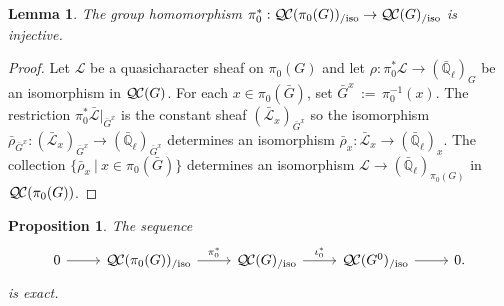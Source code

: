 \documentclass[CM,Submssn,SecEq]{degruyter-crelle} %
\theoremstyle{plain}
\newtheorem{proposition}[theorem]{Proposition}
\newtheorem{lemma}[theorem]{Lemma}
\theoremstyle{definition}
\theoremstyle{remark}
\newcommand{\EE}{\mathbb{\bar Q}_\ell}
\newcommand{\ceq}{{\, :=\, }}
\newcommand{\tq}{{\ \vert\ }}
\newcommand{\qcs}[1]{{\mathcal{#1}}}
\newcommand{\gqcs}[1]{{\mathcal{\bar #1}}}
\newcommand{\QC}{{\mathcal{Q\hskip-0.8pt C}}}
\newcommand{\QCiso}[1]{\QC(#1)_{/\text{iso}}}
\newcommand{\bG}{\bar{G}}
\newcommand{\brho}{{\bar\rho}}
\begin{document}
\begin{lemma}\label{lem:extension}
The group homomorphism $\pi_0^*: \QCiso{\pi_0(G)} \to \QCiso{G}$ is injective.
\end{lemma}
\begin{proof}
Let $\qcs{L}$ be a quasicharacter sheaf on $\pi_0(G)$ and let $\rho : \pi_0^*\qcs{L} \to (\EE)_{G}$ be an isomorphism in $\QC(G)$. 
For each $x\in \pi_0(\bG)$, set $\bG^x \ceq \pi_0^{-1}(x)$.
The restriction $\pi_0^*\gqcs{L}\vert_{\bG^x}$ is the constant sheaf $(\gqcs{L}_x)_{\bG^x}$ so the isomorphism $\brho_{\bG^x} : (\gqcs{L}_x)_{\bG^x} \to (\EE)_{\bG^x}$ determines an isomorphism $\brho_x : \gqcs{L}_x \to (\EE)_x$. The collection $\{ \brho_x \tq x\in \pi_0(\bG) \}$ determines an isomorphism $\qcs{L} \to (\EE)_{\pi_0(G)}$  in $\QC(\pi_0(G))$.
\end{proof}


\begin{proposition}\label{prop:middleexact}
 The sequence
 \[
  \begin{tikzcd}
  0 \rar & \QCiso{\pi_0(G)} \arrow{r}{\pi_0^*} & \QCiso{G} \arrow{r}{\iota_0^*} & \QCiso{G^0} \rar & 0.
  \end{tikzcd}
 \]
 is exact.
\end{proposition}
\end{document}
